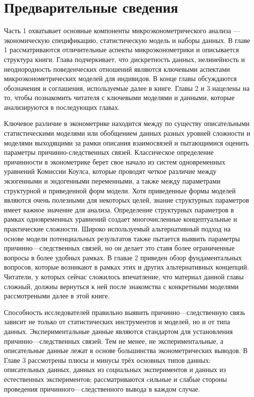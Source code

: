 

\part{Предварительные сведения}

	Часть 1 охватывает основные компоненты микроэконометрического анализа --- экономическую спецификацию, статистическую модель и наборы данных. В главе 1 рассматриваются отличительные аспекты микроэконометрики и описывается структура книги.  Глава подчеркивает, что дискретность данных, нелинейность и неоднородность поведенческих отношений являются ключевыми аспектами микроэконометрических моделей для индивидов. В конце главы обсуждаются обозначения и соглашения, используемые далее в книге.
Главы 2 и 3 нацелены на то, чтобы познакомить читателя с ключевыми моделями и данными, которые анализируются в последующих главах.


	Ключевое различие в эконометрике находится между по существу описательными статистическими моделями или обобщением данных разных уровней сложности и моделями выходящими за рамки описания взаимосвязей и пытающимися оценить параметры причинно-следственных связей. Классическое определение причинности в эконометрике берет свое начало из систем одновременных уравнений Комиссии Коулса, которые проводят четкое различие между экзогенными и эндогенными переменными, а также между параметрами структурной и приведенной форм модели. Хотя приведенные формы моделей являются очень полезными для некоторых целей, знание структурных параметров имеет важное значение для анализа. Определение структурных параметров в рамках одновременных уравнений создает многочисленные концептуальные и практические сложности. Широко используемый альтернативный подход на основе модели потенциальных результатов также пытается выявить параметры причинно---следственных связей, но он делает это ставя более ограниченные вопросы в более удобных рамках. В главае 2 приведен обзор фундаментальных вопросов, которые возникают в рамках этих и других альтернативных концепций. Читатели, у которых сейчас сложилось впечатление, что материал данной главы сложный, должны вернуться к ней после знакомства с конкретными моделями рассмотреными далее в этой книге.
	
	
	Способность исследователей правильно выявить причинно---следственную связь зависит не только от статистических инструментов и моделей, но и от типа данных. Экспериментальные данные являются стандартом для установления причинно---следственных связей. Тем не менее, не экспериментальные, а описательные данные лежат в основе большинства эконометрических выводов. В Главе 3 рассмотрены  плюсы и минусы трёх основных типов данных: описательных данных, данных из социальных экспериментов и данных из естественных экспериментов; рассматриваются cильные и слабые стороны проведения причинного---следственного вывода в каждом случае.

